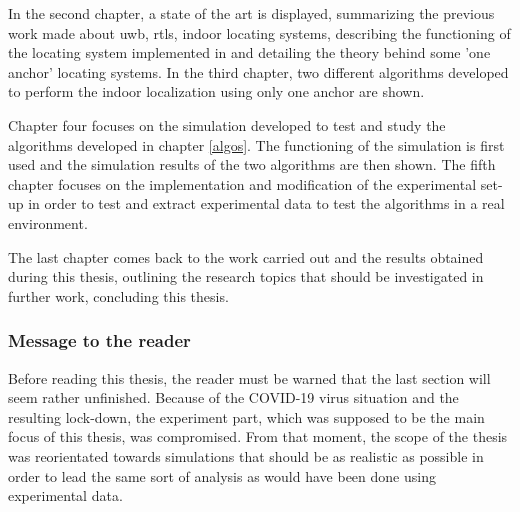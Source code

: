 In the second chapter, a state of the art is displayed, summarizing the previous work made about \gls{uwb}, \gls{rtls}, indoor locating systems, describing the functioning of the locating system implemented in \cite{hannotier2019indoor} and detailing the theory behind some 'one anchor'  locating systems. In the third chapter, two different algorithms developed to perform the indoor localization using only one anchor are shown.
\vspace{2mm}

Chapter four focuses on the simulation developed to test and study the algorithms developed in chapter \ref{algos}. The functioning of the simulation is first used and the simulation results of the two algorithms are then shown. The fifth chapter focuses on the implementation and modification of the experimental set-up in order to test and extract experimental data to test the algorithms in a real environment.
\vspace{2mm}

The last chapter comes back to the work carried out and the results obtained during this thesis, outlining the research topics that should be investigated in further work, concluding this thesis.
\vspace{2mm}

\subsubsection{Message to the reader}

Before reading this thesis, the reader must be warned that the last section will seem rather unfinished. Because of the COVID-19 virus situation and the resulting lock-down, the experiment part, which was supposed to be the main focus of this thesis, was compromised. From that moment, the scope of the thesis was reorientated towards simulations that should be as realistic as possible in order to lead the same sort of analysis as would have been done using experimental data.